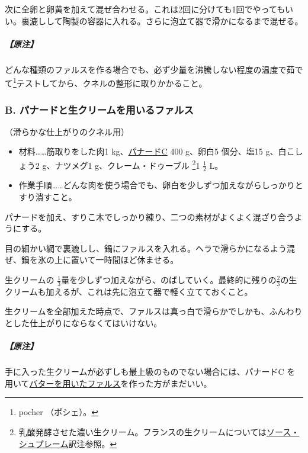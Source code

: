 \begin{recette}
次に全卵と卵黄を加えて混ぜ合わせる。これは2回に分けても1回でやってもいい。裏漉しして陶製の容器に入れる。さらに泡立て器で滑かになるまで混ぜる。

\hypertarget{nota-farce-a}{%
\subparagraph{【原注】}\label{nota-farce-a}}

どんな種類のファルスを作る場合でも、必ず少量を沸騰しない程度の温度で茹でて\footnote{pocher
  （ポシェ）。}テストしてから、クネルの整形に取りかかること。

\hypertarget{farce-b}{%
\subsubsection{B. パナードと生クリームを用いるファルス}\label{farce-b}}



（滑らかな仕上がりのクネル用）

\begin{itemize}
\item
  材料\ldots{}\ldots{}筋取りをした肉1
  kg、\protect\hyperlink{panade-c}{パナードC} 400 g、卵白5 個分、塩15
  g、白こしょう2 g、ナツメグ1 g、クレーム・ドゥーブル \footnote{乳酸発酵させた濃い生クリーム。フランスの生クリームについては\protect\hyperlink{sauce-supreme}{ソース・シュプレーム}訳注参照。}1
  \(\frac{1}{2}\) L。
\item
  作業手順\ldots{}\ldots{}どんな肉を使う場合でも、卵白を少しずつ加えながらしっかりとすり潰すこと。
\end{itemize}

パナードを加え、すりこ木でしっかり練り、二つの素材がよくよく混ざり合うようにする。

目の細かい網で裏漉しし、鍋にファルスを入れる。ヘラで滑らかになるよう混ぜ、鍋を氷の上に置いて一時間ほど休ませる。

生クリームの
\(\frac{1}{3}\)量を少しずつ加えながら、のばしていく。最終的に残りの\(\frac{2}{3}\)の生クリームも加えるが、これは先に泡立て器で軽く立てておくこと。

生クリームを全部加えた時点で、ファルスは真っ白で滑らかでしかも、ふんわりとした仕上がりにならなくてはいけない。

\hypertarget{nota-farce-b}{%
\subparagraph{【原注】}\label{nota-farce-b}}

手に入った生クリームが必ずしも最上級のものでない場合には、パナードC
を用いて\protect\hyperlink{farce-a}{バターを用いたファルス}を作った方がまだいい。


\end{recette}
